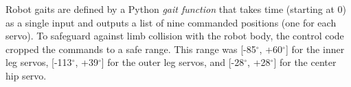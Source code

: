Robot gaits are defined by a Python \emph{gait function} that takes
time (starting at 0) as a single input and outputs a list of nine
commanded positions (one for each servo).  To safeguard against limb
collision with the robot body, the control code cropped the commands
to a safe range.  This range was [-85$^{\circ}$, +60$^{\circ}$] for
the inner leg servos, [-113$^{\circ}$, +39$^{\circ}$] for the outer
leg servos, and [-28$^{\circ}$, +28$^{\circ}$] for the center hip
servo.





